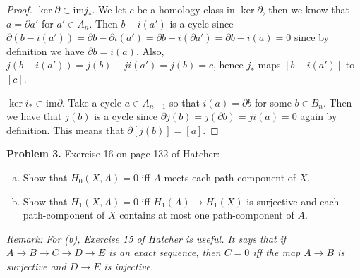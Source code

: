 \documentclass[leqno]{article}
\theoremstyle{nonumberplain}
\newtheorem{proof}{Proof}
\newcommand{\im}{\mathrm{im}}
\begin{document}
\begin{proof}
$\ker \partial \subset \im j_*$. We let $c$ be a homology class in $\ker \partial$, then we know that $a=\partial a'$ for $a'\in A_n$. Then $b-i(a')$ is a cycle since $\partial(b-i(a'))=\partial b-\partial i(a')=\partial b -i(\partial a')=\partial b-i(a)=0$ since by definition we have $\partial b =i(a)$.  Also, $j(b-i(a'))=j(b)-ji(a')=j(b)=c$, hence $j_*$ maps $[b-i(a')]$ to $[c]$.

$\ker i_*\subset \im \partial$. Take a cycle $a\in A_{n-1}$ so that $i(a)=\partial b$ for some $b\in B_n$. Then we have that $j(b)$ is a cycle since $\partial j(b)=j(\partial b)=ji(a)=0$ again by definition. This means that $\partial [j(b)]=[a]$.



\end{proof}

\vspace*{1cm}


\noindent\textbf{Problem 3.} Exercise 16 on page 132 of Hatcher:

\begin{enumerate}[(a)]
\item Show that $H_0(X,A)=0$ iff $A$ meets each path-component of $X$.
\item Show that $H_1(X,A)=0$ iff $H_1(A)\to H_1(X)$ is surjective and each path-component of $X$ contains at most one path-component of $A$.
\end{enumerate}

\noindent \emph{Remark: For (b), Exercise 15 of Hatcher is useful. It says that if $A\to B \to C \to D \to E$ is an exact sequence, then $C=0$ iff the map $A\to B$ is surjective and $D\to E$ is injective.}
\end{document}
